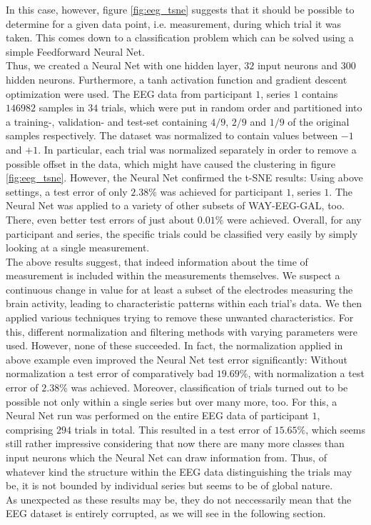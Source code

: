 \documentclass{article} %
\begin{document}
In this case, however, figure \ref{fig:eeg_tsne} suggests that it should be possible to determine for a given data point, i.e. measurement, during which trial it was taken. This comes down to a classification problem which can be solved using a simple Feedforward Neural Net.\\
Thus, we created a Neural Net with one hidden layer, $32$ input neurons and $300$ hidden neurons. Furthermore, a tanh activation function and gradient descent optimization were used. The EEG data from participant $1$, series $1$ contains $146982$ samples in $34$ trials, which were put in random order and partitioned into a training-, validation- and test-set containing $4/9$, $2/9$ and $1/9$ of the original samples respectively. The dataset was normalized to contain values between $-1$ and $+1$. In particular, each trial was normalized separately in order to remove a possible offset in the data, which might have caused the clustering in figure \ref{fig:eeg_tsne}.
However, the Neural Net confirmed the t-SNE results: Using above settings, a test error of only $2.38\%$ was achieved for participant $1$, series $1$. The Neural Net was applied to a variety of other subsets of WAY-EEG-GAL, too. There, even better test errors of just about $0.01\%$ were achieved. Overall, for any participant and series, the specific trials could be classified very easily by simply looking at a single measurement.\\
The above results suggest, that indeed information about the time of measurement is included within the measurements themselves. We suspect a continuous change in value for at least a subset of the electrodes measuring the brain activity, leading to characteristic patterns within each trial's data. We then applied various techniques trying to remove these unwanted characteristics. For this, different normalization and filtering methods with varying parameters were used. However, none of these succeeded. In fact, the normalization applied in above example even improved the Neural Net test error significantly: Without normalization a test error of comparatively bad $19.69\%$, with normalization a test error of $2.38\%$ was achieved.
Moreover, classification of trials turned out to be possible not only within a single series but over many more, too. For this, a Neural Net run was performed on the entire EEG data of participant $1$, comprising $294$ trials in total. This resulted in a test error of $15.65\%$, which seems still rather impressive considering that now there are many more classes than input neurons which the Neural Net can draw information from.
Thus, of whatever kind the structure within the EEG data distinguishing the trials may be, it is not bounded by individual series but seems to be of global nature.\\
As unexpected as these results may be, they do not neccessarily mean that the EEG dataset is entirely corrupted, as we will see in the following section.
\end{document}
